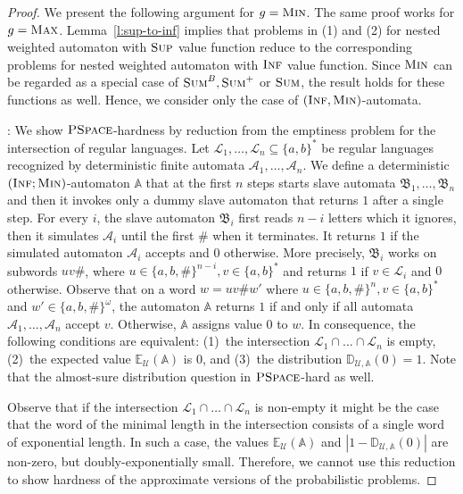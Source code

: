 \documentclass{lmcs}
\newcommand{\Paragraph}[1]{\noindent{\textbf{#1}}}
\newcommand{\nestedA}{\mathbb{A}}
\newcommand{\slaveA}{{\mathfrak{B}}}
\newcommand{\lang}{\mathcal{L}}
\newcommand{\PSPACE}{\textsc{PSpace}{}}
\newcommand{\fsum}{\textsc{Sum}}
\newcommand{\fBsum}[1]{\textsc{Sum}^{#1}}
\newcommand{\fmax}{\textsc{Max}}
\newcommand{\fmin}{\textsc{Min}}
\newcommand{\fsup}{\textsc{Sup}}
\newcommand{\finf}{\textsc{Inf}}
\newcommand{\aut}{\mathcal{A}}
\newcommand{\expected}{\mathbb{E}}
\newcommand{\distrib}{\mathbb{D}}
\newcommand{\calU}{\mathcal{U}}
\begin{document}
\begin{proof}
We present the following argument for $g  = \fmin$. The same proof works for $g = \fmax$.
Lemma~\ref{l:sup-to-inf} implies that problems in (1) and (2) for nested weighted automaton with $\fsup$ value function reduce to the corresponding problems for  nested weighted automaton with $\finf$ value function.
Since $\fmin$ can be regarded as a special case of $\fBsum{B}, \fsum^+$ or $\fsum$, the result holds for these functions as well.
Hence, we consider only the case of $(\finf, \fmin)$-automata.

\Paragraph{PSpace-hardness}: We show $\PSPACE$-hardness by reduction from the emptiness problem for the intersection of regular languages.
Let $\lang_1, \ldots, \lang_n \subseteq {\{a,b\}}^*$ be regular languages recognized by
deterministic finite automata $\aut_1, \ldots, \aut_n$.
We define a deterministic $(\finf;\fmin)$-automaton $\nestedA$ that at the first $n$ steps starts slave automata
$\slaveA_1, \ldots, \slaveA_n$ and then it invokes only a dummy slave automaton that returns $1$ after a single step.
For every $i$, the slave automaton $\slaveA_i$ first reads $n-i$ letters which it ignores, then
it simulates $\aut_i$ until the first $\#$ when it terminates. It returns $1$ if the simulated automaton $\aut_i$ accepts
and $0$ otherwise. More precisely, $\slaveA_i$ works on subwords $uv \#$, where $u \in {\{a,b,\#\}}^{n-i}, v \in {\{a,b \}}^*$ and
returns $1$ if $v \in \lang_i$ and $0$ otherwise.
Observe that on a word $w = u v \# w'$ where $u \in {\{a,b,\# \}}^{n}, v \in {\{a,b\}}^*$ and $w' \in {\{a,b,\# \}}^{\omega}$,
the automaton $\nestedA$ returns $1$ if and only if all automata $\aut_1, \ldots, \aut_n$ accept $v$.
Otherwise, $\nestedA$ assigns value $0$ to $w$.
In consequence, the following conditions are equivalent:
(1)~the intersection  $\lang_1 \cap \ldots \cap \lang_n$ is empty,
(2)~the expected value $\expected_{\calU}(\nestedA)$ is $0$, and
(3)~the distribution $\distrib_{\calU, \nestedA}(0) = 1$.
Note that the almost-sure distribution question in $\PSPACE$-hard as well.

Observe that if the intersection $\lang_1 \cap \ldots \cap \lang_n$ is non-empty it might be the case that the word of the minimal
length in the intersection consists of a single word of  exponential length. In such a case, the values
$\expected_{\calU}(\nestedA)$ and $|1-\distrib_{\calU, \nestedA}(0)|$ are non-zero, but doubly-exponentially small.
Therefore, we cannot use this reduction to show hardness of the approximate versions of the probabilistic problems.


\end{proof}
\end{document}
